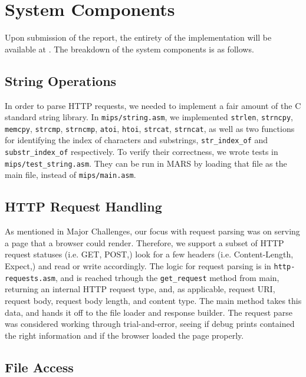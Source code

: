 \documentclass[journal,10pt]{IEEEtran}
\begin{document}
\section{System Components}

Upon submission of the report, the entirety of the implementation will be available at \cite{Brennan}. The breakdown of the system components is as follows.

\subsection{String Operations}

In order to parse HTTP requests, we needed to implement a fair amount of the C
standard string library.  In \texttt{mips/string.asm}, we implemented
\texttt{strlen}, \texttt{strncpy}, \texttt{memcpy}, \texttt{strcmp},
\texttt{strncmp}, \texttt{atoi}, \texttt{htoi}, \texttt{strcat},
\texttt{strncat}, as well as two functions for identifying the index of
characters and substrings, \texttt{str\_index\_of} and
\texttt{substr\_index\_of} respectively.  To verify their correctness, we wrote
tests in \texttt{mips/test\_string.asm}.  They can be run in MARS by loading
that file as the main file, instead of \texttt{mips/main.asm}.

\subsection{HTTP Request Handling}

As mentioned in Major Challenges, our focus with request parsing was on serving
a page that a browser could render. Therefore, we support a subset of HTTP
request statuses (i.e. GET, POST,) look for a few headers (i.e. Content-Length,
Expect,) and read or write accordingly. The logic for request parsing is in
\texttt{http-requests.asm}, and is reached trhough the \texttt{get\_request}
method from main, returning an internal HTTP request type, and, as applicable, 
request URI, request body, request body length, and content type. The main
method takes this data, and hands it off to the file loader and response builder.
The request parse was considered working through trial-and-error, seeing if debug
prints contained the right information and if the browser loaded the page
properly.

\subsection{File Access}
\end{document}

